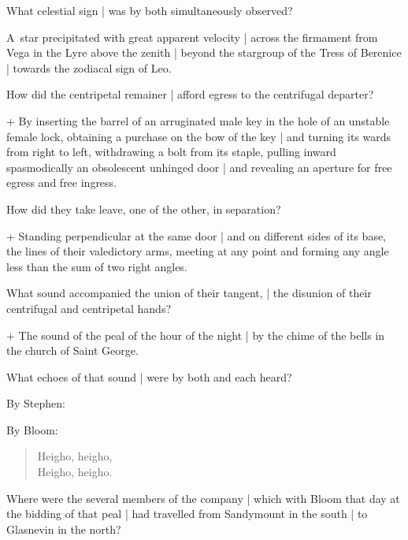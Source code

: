 What celestial sign |
was by both simultaneously observed?

\Science
A~star precipitated with great apparent velocity |
across the firmament from Vega in the Lyre above the zenith |
beyond the stargroup of the Tress of Berenice |
towards the zodiacal sign of Leo.



How did the centripetal remainer |
afford egress to the centrifugal departer?

\Science + \Factual
By inserting the barrel of an arruginated male key
in the hole of an unstable female lock,
obtaining a purchase on the bow of the key |
and turning its wards from right to left,
withdrawing a bolt from its staple,
pulling inward spasmodically an obsolescent unhinged door |
and revealing an aperture for free egress and free ingress.



How did they take leave, one of the other, in separation?%

\Science + \Factual
Standing perpendicular at the same door |
and on different sides of its base,
the lines of their valedictory arms,
meeting at any point and forming any angle less than the sum of two right angles.



What sound accompanied the union of their tangent, |
the disunion of their
centrifugal and centripetal hands?

\Places + \Poetry
The sound of the peal of the hour of the night |
by the chime of the bells in the church of Saint George.


What echoes of that sound |
were by both and each heard?

\Religious
By Stephen:


\Factual
By Bloom:

\begin{verse}
    Heigho, heigho,\\
    Heigho, heigho.
\end{verse}


Where were the several members of the company |
which with Bloom that day at the bidding of that peal |
had travelled from Sandymount in the south |
to Glasnevin in the north?

